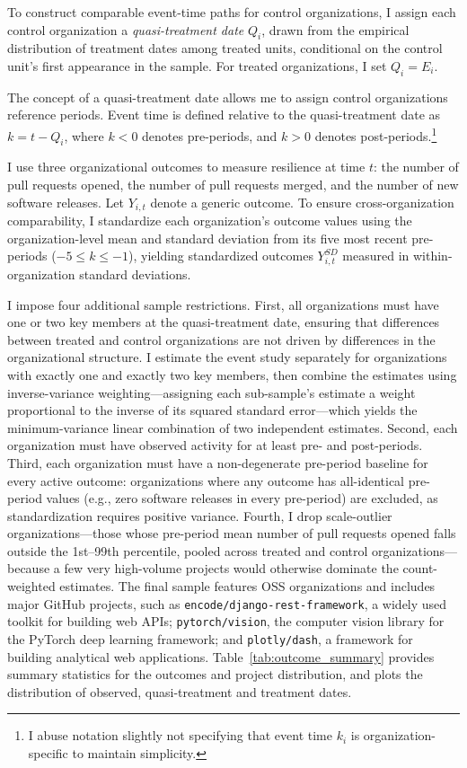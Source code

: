 \documentclass[12pt,notitlepage]{article}
\begin{document}
To construct comparable event-time paths for control organizations, I assign each control organization a \textit{quasi-treatment date} $Q_i$, drawn from the empirical distribution of treatment dates among treated units, conditional on the control unit's first appearance in the sample. 
For treated organizations, I set $Q_i = E_i$.

The concept of a quasi-treatment date allows me to assign control organizations reference periods.
Event time is defined relative to the quasi-treatment date as $k=t-Q_i$, where $k<0$ denotes pre-periods, and $k>0$ denotes post-periods.\footnote{I abuse notation slightly not specifying that event time $k_i$ is organization-specific to maintain simplicity.}

I use three organizational outcomes to measure resilience at time $t$: the number of pull requests opened, the number of pull requests merged, and the number of new software releases.
Let $Y_{i,t}$ denote a generic outcome. 
To ensure cross-organization comparability, I standardize each organization’s outcome values using the organization-level mean and standard deviation from its five most recent pre-periods ($-5 \leq k \leq -1$), yielding standardized outcomes $Y_{i,t}^{SD}$ measured in within-organization standard deviations. 

I impose four additional sample restrictions.
First, all organizations must have one or two key members at the quasi-treatment date, ensuring that differences between treated and control organizations are not driven by differences in the organizational structure.
I estimate the event study separately for organizations with exactly one and exactly two key members, then combine the estimates using inverse-variance weighting---assigning each sub-sample's estimate a weight proportional to the inverse of its squared standard error---which yields the minimum-variance linear combination of two independent estimates.
Second, each organization must have observed activity for at least \NumPostPeriod{} pre- and \NumPostPeriod{} post-periods.
Third, each organization must have a non-degenerate pre-period baseline for every active outcome: organizations where any outcome has all-identical pre-period values (e.g., zero software releases in every pre-period) are excluded, as standardization requires positive variance.
Fourth, I drop scale-outlier organizations---those whose pre-period mean number of pull requests opened falls outside the 1st--99th percentile, pooled across treated and control organizations---because a few very high-volume projects would otherwise dominate the count-weighted estimates.
The final sample features \NumOrgs{} OSS organizations and includes major GitHub projects, such as \texttt{encode/django-rest-framework}, a widely used toolkit for building web APIs; \texttt{pytorch/vision}, the computer vision library for the PyTorch deep learning framework; and \texttt{plotly/dash}, a framework for building analytical web applications.
Table~\ref{tab:outcome_summary} provides summary statistics for the outcomes and project distribution, and plots the distribution of observed, quasi-treatment and treatment dates.
\end{document}

